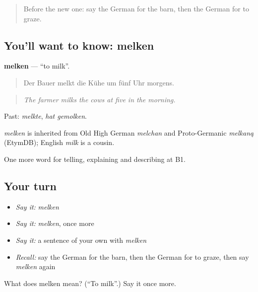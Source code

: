 \begin{quote}
Before the new one: say the German for the barn, then the German for to graze.
\end{quote}

\subsection*{You'll want to know: melken}
\textbf{melken} — \textquotedblleft{}to milk\textquotedblright{}.

\begin{quote}
Der Bauer melkt die Kühe um fünf Uhr morgens.
\end{quote}

\begin{quote}
\emph{The farmer milks the cows at five in the morning.}
\end{quote}

Past: \emph{melkte}, \emph{hat gemolken}.

\begin{cousinweb}
\emph{melken} is inherited from Old High German \emph{melchan} and Proto-Germanic \emph{melkaną} (EtymDB); English \emph{milk} is a cousin.
\end{cousinweb}

\begin{grammarlens}[title={What you've built}]
One more word for telling, explaining and describing at B1.
\end{grammarlens}

\subsection*{Your turn}
\begin{itemize}
\raggedright
  \item \emph{Say it:} \emph{melken}
  \item \emph{Say it:} \emph{melken}, once more
  \item \emph{Say it:} a sentence of your own with \emph{melken}
  \item \emph{Recall:} say the German for the barn, then the German for to graze, then say \emph{melken} again
\end{itemize}

\begin{tcolorbox}[breakable,colback=teal!4,colframe=teal!35!black,title={Before you move on}]
What does melken mean? (\textquotedblleft{}To milk\textquotedblright{}.) Say it once more.
\end{tcolorbox}
